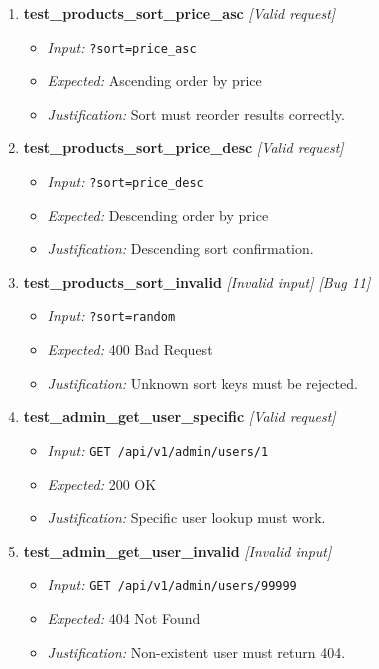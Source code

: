 \documentclass{article}
\begin{document}
\begin{enumerate}[resume, label=\textbf{TC\arabic*.}]
\item \textbf{test\_products\_sort\_price\_asc} \textit{[Valid request]}
\begin{itemize}[noitemsep]
  \item \textit{Input:} \texttt{?sort=price\_asc}
  \item \textit{Expected:} Ascending order by price
  \item \textit{Justification:} Sort must reorder results correctly.
\end{itemize}

\item \textbf{test\_products\_sort\_price\_desc} \textit{[Valid request]}
\begin{itemize}[noitemsep]
  \item \textit{Input:} \texttt{?sort=price\_desc}
  \item \textit{Expected:} Descending order by price
  \item \textit{Justification:} Descending sort confirmation.
\end{itemize}

\item \textbf{test\_products\_sort\_invalid} \textit{[Invalid input] \textit{[Bug 11]}}
\begin{itemize}[noitemsep]
  \item \textit{Input:} \texttt{?sort=random}
  \item \textit{Expected:} 400 Bad Request
  \item \textit{Justification:} Unknown sort keys must be rejected.
\end{itemize}

\item \textbf{test\_admin\_get\_user\_specific} \textit{[Valid request]}
\begin{itemize}[noitemsep]
  \item \textit{Input:} \texttt{GET /api/v1/admin/users/1}
  \item \textit{Expected:} 200 OK
  \item \textit{Justification:} Specific user lookup must work.
\end{itemize}

\item \textbf{test\_admin\_get\_user\_invalid} \textit{[Invalid input]}
\begin{itemize}[noitemsep]
  \item \textit{Input:} \texttt{GET /api/v1/admin/users/99999}
  \item \textit{Expected:} 404 Not Found
  \item \textit{Justification:} Non-existent user must return 404.
\end{itemize}
\end{enumerate}
\end{document}
